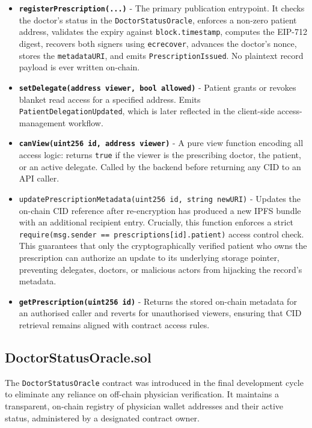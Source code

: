 \documentclass[12pt,a4wide]{report}
\begin{document}
\begin{itemize}
  \item \textbf{\texttt{registerPrescription(...)}} -
    The primary publication entrypoint. It checks the doctor's status in the
    \texttt{DoctorStatusOracle}, enforces a non-zero patient address, validates
    the expiry against \texttt{block.timestamp}, computes the EIP-712 digest,
    recovers both signers using \texttt{ecrecover}, advances the doctor's nonce,
    stores the \texttt{metadataURI}, and emits \texttt{PrescriptionIssued}. No
    plaintext record payload is ever written on-chain.
  \item \textbf{\texttt{setDelegate(address viewer, bool allowed)}} - Patient
    grants or revokes blanket read access for a specified address. Emits
    \texttt{PatientDelegationUpdated}, which is later reflected in the client-side
    access-management workflow.
  \item \textbf{\texttt{canView(uint256 id, address viewer)}} - A pure view
    function encoding all access logic: returns \texttt{true} if the viewer is
    the prescribing doctor, the patient, or an active delegate. Called by the
    backend before returning any CID to an API caller.
  \item \texttt{updatePrescriptionMetadata(uint256 id, string newURI)} - Updates the on-chain CID reference after re-encryption has produced a new IPFS bundle with an additional recipient entry. Crucially, this function enforces a strict \texttt{require(msg.sender == prescriptions[id].patient)} access control check. This guarantees that only the cryptographically verified patient who owns the prescription can authorize an update to its underlying storage pointer, preventing delegates, doctors, or malicious actors from hijacking the record's metadata.
  \item \textbf{\texttt{getPrescription(uint256 id)}} - Returns the stored
    on-chain metadata for an authorised caller and reverts for unauthorised
    viewers, ensuring that CID retrieval remains aligned with contract access rules.
\end{itemize}

\subsection{DoctorStatusOracle.sol}

The \texttt{DoctorStatusOracle} contract was introduced in the final development
cycle to eliminate any reliance on off-chain physician verification. It maintains
a transparent, on-chain registry of physician wallet addresses and their active
status, administered by a designated contract owner.
\end{document}
